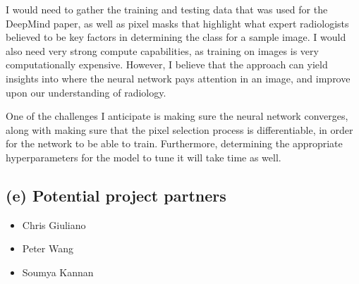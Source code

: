 \documentclass[11pt]{article}
\begin{document}
I would need to gather the training and testing data that was used
for the DeepMind paper, as well as pixel masks that highlight what
expert radiologists believed to be key factors in determining the
class for a sample image. I would also need very strong compute
capabilities, as training on images is very computationally expensive.
However, I believe that the approach can yield insights into where
the neural network pays attention in an image, and improve upon
our understanding of radiology.

One of the challenges I anticipate is making sure the neural network
converges, along with making sure that the pixel selection process is
differentiable, in order for the network to be able to train. Furthermore, 
determining the appropriate hyperparameters for the model to tune it will
take time as well.

\subsection*{(e) Potential project partners}
\begin{itemize}[noitemsep]
\item Chris Giuliano
\item Peter Wang
\item Soumya Kannan
\end{itemize}
\end{document}

